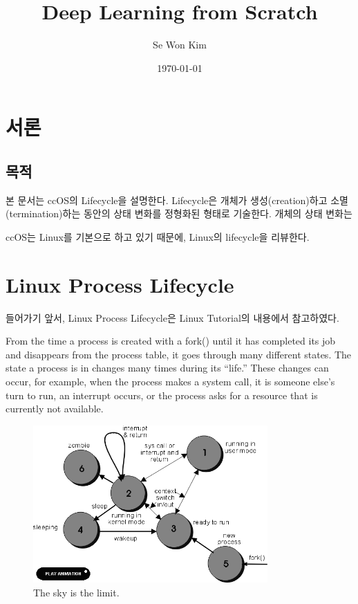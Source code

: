 \documentclass[12pt]{article}
\title{Deep Learning from Scratch}
\author{Se Won Kim }
\date{\today}
\begin{document}
\maketitle

\tableofcontents

\clearpage
\section{서론}
\subsection{목적}
본 문서는 ccOS의 Lifecycle을 설명한다. Lifecycle은 개체가 생성(creation)하고 소멸(termination)하는 동안의 상태 변화를 정형화된 형태로 기술한다.
개체의 상태 변화는 

ccOS는 Linux를 기본으로 하고 있기 때문에, Linux의 lifecycle을 리뷰한다.



\clearpage
\section{Linux Process Lifecycle}

들어가기 앞서, Linux Process Lifecycle은 Linux Tutorial의 내용에서 참고하였다.

 From the time a process is created with a fork() until it has completed its job and disappears from the process table, it goes through many different states. The state a process is in changes many times during its ``life.'' These changes can occur, for example, when the process makes a system call, it is someone else's turn to run, an interrupt occurs, or the process asks for a resource that is currently not available.

\begin{figure}[!h]
\centering
\includegraphics[width=0.8\textwidth]{fig/procflowc.png}
\caption{The sky is the limit.}
\end{figure}
\end{document}

